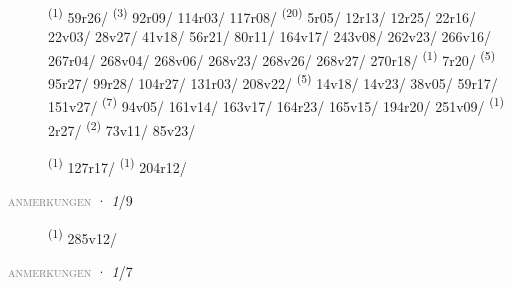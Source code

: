 \begin{description}
    \item[]  \textsuperscript{(1)} \mbox{59r26/} \textsuperscript{(3)} \mbox{92r09/} \mbox{114r03/} \mbox{117r08/} \CASEBREAK {} \textsuperscript{(20)} \mbox{5r05/} \mbox{12r13/} \mbox{12r25/} \mbox{22r16/} \mbox{22v03/} \mbox{28v27/} \mbox{41v18/} \mbox{56r21/} \mbox{80r11/} \mbox{164v17/} \mbox{243v08/} \mbox{262v23/} \mbox{266v16/} \mbox{267r04/} \mbox{268v04/} \mbox{268v06/} \mbox{268v23/} \mbox{268v26/} \mbox{268v27/} \mbox{270r18/} \textsuperscript{(1)} \mbox{7r20/} \textsuperscript{(5)} \mbox{95r27/} \mbox{99r28/} \mbox{104r27/} \mbox{131r03/} \mbox{208v22/} \CASEBREAK {} \textsuperscript{(5)} \mbox{14v18/} \mbox{14v23/} \mbox{38v05/} \mbox{59r17/} \mbox{151v27/} \textsuperscript{(7)} \mbox{94v05/} \mbox{161v14/} \mbox{163v17/} \mbox{164r23/} \mbox{165v15/} \mbox{194r20/} \mbox{251v09/} \CASEBREAK {} \textsuperscript{(1)} \mbox{2r27/} \textsuperscript{(2)} \mbox{73v11/} \mbox{85v23/}
    \item[]  \textsuperscript{(1)} \mbox{127r17/} \CASEBREAK {} \textsuperscript{(1)} \mbox{204r12/}
\end{description}
\textsc{\textcolor{gray}{anmerkungen}}
\ENTRYEND
\noindent{} · \textit{1}/9 \LEMMALINE
\begin{description}
    \item[]  \textsuperscript{(1)} \mbox{285v12/}
\end{description}
\textsc{\textcolor{gray}{anmerkungen}}
\ENTRYEND
\noindent{} · \textit{1}/7 \LEMMALINE
